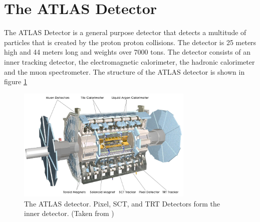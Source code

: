\section{The ATLAS Detector}
\label{LHC:detector}
\indent The ATLAS Detector is a general purpose detector that detects a multitude of particles that is created by the proton proton collisions. The detector is 25 meters high and 44 meters long and weights over 7000 tons.\cite{biblio:JINST} The detector consists of an inner tracking detector, the electromagnetic calorimeter, the hadronic calorimeter and the muon spectrometer. The structure of the ATLAS detector is shown in figure \ref{LHC:fig:ATLASDet} ~\\
\begin{figure}[h!]
\centering
\includegraphics[width=0.75\textwidth, angle=0]{figures/DET/ATLAS_detector_alles_mittel_EN.PNG}
\caption{ The ATLAS detector. Pixel, SCT, and TRT Detectors form the inner detector.  (Taken from \cite{biblio:JINST}) \label{LHC:fig:ATLASDet}}
\end{figure}

